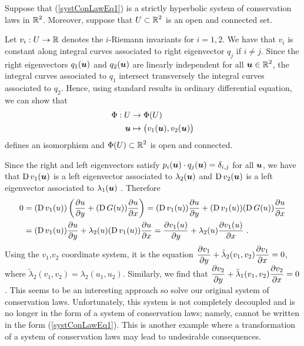 \begin{rmk}
Suppose that (\ref{systConLawEq1}) is a strictly hyperbolic system of
conservation laws in $\displaystyle \mathbb{R}^2$.  Moreover, suppose that
$\displaystyle U \subset \mathbb{R}^2$ is an open and connected set.

Let $v_i:U \to \mathbb{R}$ denotes the $i$-Riemann invariants for $i=1,2$.
We have that $v_i$ is constant along integral curves associated to
right eigenvector $q_j$ if $i \neq j$.  Since the right eigenvectors
$q_1({\bm{u}})$ and $q_2({\bm{u}})$ are linearly independent for all
$\displaystyle {\bm{u}} \in \mathbb{R}^2$, the integral curves associated to
$q_1$ intersect transversely the integral curves associated to $q_2$.
Hence, using standard results in ordinary differential equation, we
can show that
\begin{align*}
\Phi : U & \to \Phi(U) \\
{\bm{u}} &\mapsto \big(v_1({\bm{u}}), v_2({\bm{u}})\big)
\end{align*}
defines an isomorphism and $\displaystyle \Phi(U) \subset \mathbb{R}^2$ is open and
connected.

Since the right and left eigenvectors satisfy
$p_i({\bm{u}})\cdot q_j({\bm{u}}) = \delta_{i,j}$ for all ${\bm{u}}$,
we have that $\operatorname{D} v_1({\bm{u}})$ is a left eigenvector associated to
$\lambda_2({\bm{u}})$ and $\operatorname{D} v_2({\bm{u}})$ is a left eigenvector
associated to $\lambda_1({\bm{u}})$ .  Therefore 
\begin{align*}
0 &= (\operatorname{D} v_1(u))  \left( \frac{\partial{u}}{\partial y} + (\operatorname{D} G(u)) \frac{\partial{u}}{\partial x} \right)
= (\operatorname{D} v_1(u)) \frac{\partial{u}}{\partial y} + (\operatorname{D} v_1(u)) (\operatorname{D} G(u)) \frac{\partial{u}}{\partial x} \\
&= (\operatorname{D} v_1(u)) \frac{\partial{u}}{\partial y} + \lambda_2(u) (\operatorname{D} v_1(u)) \frac{\partial{u}}{\partial x}
= \frac{\partial{v_1(u)}}{\partial y} + \lambda_2(u) \frac{\partial{v_1(u)}}{\partial x} \ .
\end{align*}
Using the $v_1$,$v_2$ coordinate system, it is the equation
$\displaystyle \frac{\partial{v_1}}{\partial y} + \tilde{\lambda}_2(v_1,v_2) \frac{\partial{v_1}}{\partial x} =
0$, where $\tilde{\lambda}_2(v_1,v_2) = \lambda_2(u_1,u_2)$.
Similarly, we find that
$\displaystyle \frac{\partial{v_2}}{\partial y} + \tilde{\lambda}_1(v_1,v_2) \frac{\partial{v_2}}{\partial x} = 0$.
This seems to be an interesting approach so solve our original system of
conservation laws.  Unfortunately, this system is not completely
decoupled and is no longer in the form of a system of conservation
laws; namely, cannot be written in the form (\ref{systConLawEq1}).
This is another example where a transformation of a system of
conservation laws may lead to undesirable consequences.
\end{rmk}

